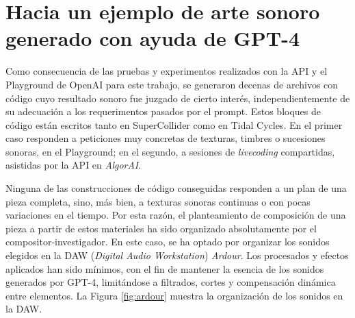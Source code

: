 \chapter{Hacia un ejemplo de arte sonoro generado con ayuda de GPT-4}



Como consecuencia de las pruebas y experimentos realizados con la API y el Playground de OpenAI para este trabajo, se generaron decenas de archivos con código cuyo resultado sonoro fue juzgado de cierto interés, independientemente de su adecuación a los requerimentos pasados por el prompt. Estos bloques de código están escritos tanto en SuperCollider como en Tidal Cycles. En el primer caso responden a peticiones muy concretas de texturas, timbres o sucesiones sonoras, en el Playground; en el segundo, a sesiones de \textit{livecoding} compartidas, asistidas por la API en \textit{AlgorAI}.

Ninguna de las construcciones de código conseguidas responden a un plan de una pieza completa, sino, más bien, a texturas sonoras continuas o con pocas variaciones en el tiempo. Por esta razón, el planteamiento de composición de una pieza a partir de estos materiales ha sido organizado absolutamente por el compositor-investigador. En este caso, se ha optado por organizar los sonidos elegidos en la DAW (\textit{Digital Audio Workstation}) \textit{Ardour}. Los procesados y efectos aplicados han sido mínimos, con el fin de mantener la esencia de los sonidos generados por GPT-4, limitándose a filtrados, cortes y compensación dinámica entre elementos. La Figura \ref{fig:ardour} muestra la organización de los sonidos en la DAW.

